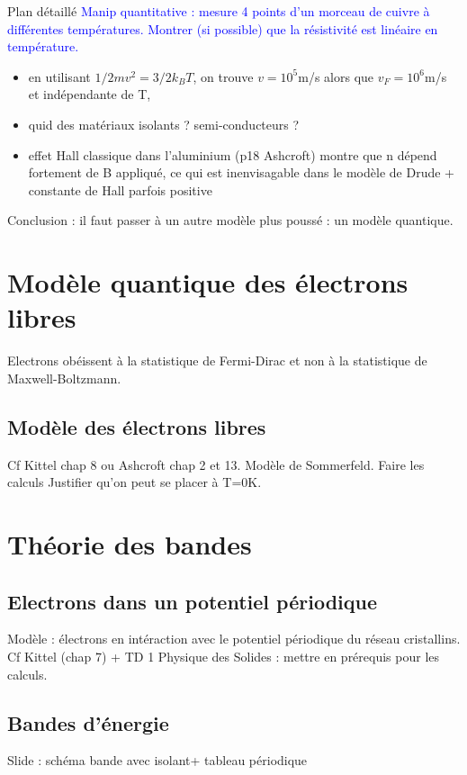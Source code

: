 \begin{reportBlock}{Plan détaillé}
\textcolor{blue}{Manip quantitative : mesure 4 points d'un morceau de cuivre à différentes températures. Montrer (si possible) que la résistivité est linéaire en température.}\\
\begin{itemize}
    \item en utilisant $1/2mv^2=3/2k_BT$, on trouve $v=10^5$m/s alors que $v_{F}=10^6$m/s et indépendante de T,
    \item quid des matériaux isolants ? semi-conducteurs ?
    \item effet Hall classique dans l'aluminium (p18 Ashcroft) montre que n dépend fortement de B appliqué, ce qui est inenvisagable dans le modèle de Drude + constante de Hall parfois positive
\end{itemize}

Conclusion : il faut passer à un autre modèle plus poussé : un modèle quantique.

\section{Modèle quantique des électrons libres}
Electrons obéissent à la statistique de Fermi-Dirac et non à la statistique de Maxwell-Boltzmann.
\subsection{Modèle des électrons libres}
Cf Kittel chap 8 ou Ashcroft chap 2 et 13. Modèle de Sommerfeld. Faire les calculs Justifier qu'on peut se placer à T=0K.

\section{Théorie des bandes}

\subsection{Electrons dans un potentiel périodique}
Modèle : électrons en intéraction avec le potentiel périodique du réseau cristallins.\\
Cf Kittel (chap 7) + TD 1 Physique des Solides : mettre en prérequis pour les calculs.

\subsection{Bandes d'énergie}
Slide : schéma bande avec isolant+ tableau périodique 


\end{reportBlock}
